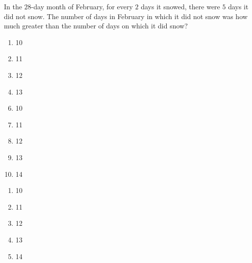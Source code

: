 In the $28$-day month of February, for every
$2$ days it snowed, there were $5$ days it did
not snow.  The number of days in February
in which it did not snow was how much
greater than the number of days on which
it did snow?




\ifsat
	\begin{enumerate}[label=\Alph*)]
		\item 10
		\item 11
		\item 12%
		\item 13
	\end{enumerate}
\else
\fi

\ifacteven
	\begin{enumerate}[label=\textbf{\Alph*.},itemsep=\fill,align=left]
		\setcounter{enumii}{5}
		\item 10
		\item 11
		\item 12%
		\addtocounter{enumii}{1}
		\item 13
		\item 14
	\end{enumerate}
\else
\fi

\ifactodd
	\begin{enumerate}[label=\textbf{\Alph*.},itemsep=\fill,align=left]
		\item 10
		\item 11
		\item 12%
		\item 13
		\item 14
	\end{enumerate}
\else
\fi

%
		
\else
\fi

